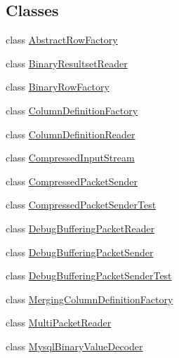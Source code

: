\subsection*{Classes}
\begin{DoxyCompactItemize}
\item 
class \mbox{\hyperlink{classcom_1_1mysql_1_1cj_1_1protocol_1_1a_1_1_abstract_row_factory}{Abstract\+Row\+Factory}}
\item 
class \mbox{\hyperlink{classcom_1_1mysql_1_1cj_1_1protocol_1_1a_1_1_binary_resultset_reader}{Binary\+Resultset\+Reader}}
\item 
class \mbox{\hyperlink{classcom_1_1mysql_1_1cj_1_1protocol_1_1a_1_1_binary_row_factory}{Binary\+Row\+Factory}}
\item 
class \mbox{\hyperlink{classcom_1_1mysql_1_1cj_1_1protocol_1_1a_1_1_column_definition_factory}{Column\+Definition\+Factory}}
\item 
class \mbox{\hyperlink{classcom_1_1mysql_1_1cj_1_1protocol_1_1a_1_1_column_definition_reader}{Column\+Definition\+Reader}}
\item 
class \mbox{\hyperlink{classcom_1_1mysql_1_1cj_1_1protocol_1_1a_1_1_compressed_input_stream}{Compressed\+Input\+Stream}}
\item 
class \mbox{\hyperlink{classcom_1_1mysql_1_1cj_1_1protocol_1_1a_1_1_compressed_packet_sender}{Compressed\+Packet\+Sender}}
\item 
class \mbox{\hyperlink{classcom_1_1mysql_1_1cj_1_1protocol_1_1a_1_1_compressed_packet_sender_test}{Compressed\+Packet\+Sender\+Test}}
\item 
class \mbox{\hyperlink{classcom_1_1mysql_1_1cj_1_1protocol_1_1a_1_1_debug_buffering_packet_reader}{Debug\+Buffering\+Packet\+Reader}}
\item 
class \mbox{\hyperlink{classcom_1_1mysql_1_1cj_1_1protocol_1_1a_1_1_debug_buffering_packet_sender}{Debug\+Buffering\+Packet\+Sender}}
\item 
class \mbox{\hyperlink{classcom_1_1mysql_1_1cj_1_1protocol_1_1a_1_1_debug_buffering_packet_sender_test}{Debug\+Buffering\+Packet\+Sender\+Test}}
\item 
class \mbox{\hyperlink{classcom_1_1mysql_1_1cj_1_1protocol_1_1a_1_1_merging_column_definition_factory}{Merging\+Column\+Definition\+Factory}}
\item 
class \mbox{\hyperlink{classcom_1_1mysql_1_1cj_1_1protocol_1_1a_1_1_multi_packet_reader}{Multi\+Packet\+Reader}}
\item 
class \mbox{\hyperlink{classcom_1_1mysql_1_1cj_1_1protocol_1_1a_1_1_mysql_binary_value_decoder}{Mysql\+Binary\+Value\+Decoder}}

\end{DoxyCompactItemize}
